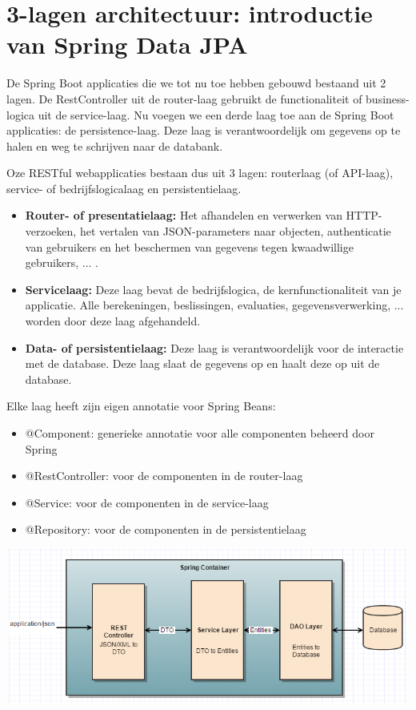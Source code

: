 \chapter{3-lagen architectuur: introductie van Spring Data JPA}

De Spring Boot applicaties die we tot nu toe hebben gebouwd bestaand uit 2 lagen. De RestController uit de router-laag gebruikt de functionaliteit of business-logica uit de service-laag.
Nu voegen we een derde laag toe aan de Spring Boot applicaties: de persistence-laag. Deze laag is verantwoordelijk om gegevens op te halen en weg te schrijven naar de databank.

Oze RESTful webapplicaties bestaan dus uit 3 lagen:
routerlaag (of API-laag), service- of bedrijfslogicalaag en persistentielaag.

\begin{itemize}
\item \textbf{Router- of presentatielaag:} Het afhandelen en verwerken van HTTP-verzoeken, het vertalen van JSON-parameters naar objecten, authenticatie van gebruikers en het beschermen van gegevens tegen kwaadwillige gebruikers, ... .
\item \textbf{Servicelaag:} Deze laag bevat de bedrijfslogica, de kernfunctionaliteit van je applicatie. Alle berekeningen, beslissingen, evaluaties, gegevensverwerking, ... worden door deze laag afgehandeld.
\item \textbf{Data- of persistentielaag:} Deze laag is verantwoordelijk voor de interactie met de database. Deze laag slaat de gegevens op en haalt deze op uit de database.
\end{itemize}

Elke laag heeft zijn eigen annotatie voor Spring Beans:

\begin{itemize}
\item @Component: generieke annotatie voor alle componenten beheerd door Spring
\item @RestController: voor de componenten in de router-laag
\item @Service: voor de componenten in de service-laag
\item @Repository: voor de componenten in de persistentielaag
\end{itemize}


\includegraphics[width=\textwidth]{./images/Spring-REST-Web-Services.png} 

